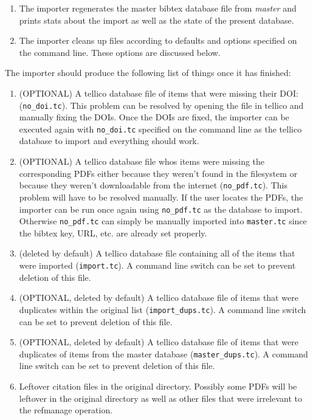 \documentclass[letterpaper,12pt]{article}
\begin{document}
\begin{enumerate}
\item The importer regenerates the master bibtex database file from \emph{master} and prints stats about the import as well as the state of the present database.

\item The importer cleans up files according to defaults and options specified on the command line. These options are discussed below.
\end{enumerate}


The importer should produce the following list of things once it has finished:

\begin{enumerate}
\item (OPTIONAL) A tellico database file of items that were missing their DOI: (\verb|no_doi.tc|). This problem can be resolved by opening the file in tellico and manually fixing the DOIs. Once the DOIs are fixed, the importer can be executed again with \verb|no_doi.tc| specified on the command line as the tellico database to import and everything should work.
\item (OPTIONAL) A tellico database file whos items were missing the corresponding PDFs either because they weren't found in the filesystem or because they weren't downloadable from the internet (\verb|no_pdf.tc|). This problem will have to be resolved manually. If the user locates the PDFs, the importer can be run once again using \verb|no_pdf.tc| as the database to import. Otherwise \verb|no_pdf.tc| can simply be manually imported into \verb|master.tc| since the bibtex key, URL, etc. are already set properly.
\item (deleted by default) A tellico database file containing all of the items that were imported (\verb|import.tc|). A command line switch can be set to prevent deletion of this file.
\item (OPTIONAL, deleted by default) A tellico database file of items that were duplicates within the original list (\verb|import_dups.tc|). A command line switch can be set to prevent deletion of this file.
\item (OPTIONAL, deleted by default) A tellico database file of items that were duplicates of items from the master database (\verb|master_dups.tc|). A command line switch can be set to prevent deletion of this file.
\item Leftover citation files in the original directory. Possibly some PDFs will be leftover in the original directory as well as other files that were irrelevant to the refmanage operation.
\end{enumerate}
\end{document}
